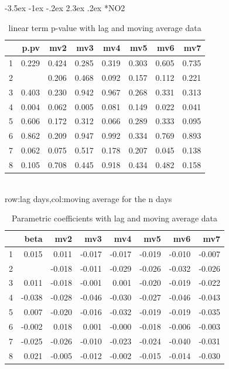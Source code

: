 \documentclass[a4paper, 12pt]{article}
\makeatletter
\def\large{\fontsize{14}{20}\selectfont}
\renewcommand\subsection{\@startsection {subsection}{1}{\z@}%
                                   {-3.5ex \@plus -1ex \@minus -.2ex}%
                                   {2.3ex \@plus.2ex}%
                                   {\centering\normalfont\large\bfseries}}
\makeatother
\begin{document}
\subsection*{NO2}
\begin{table}[h]
\centering
\caption{linear term p-value with lag and moving average data}
\begin{tabular}{rrrrrrrr}
  \hline
 & p.pv & mv2 & mv3 & mv4 & mv5 & mv6 & mv7 \\
  \hline
1 & 0.229 & 0.424 & 0.285 & 0.319 & 0.303 & 0.605 & 0.735 \\
  2 & \color{red}{0.000} & 0.206 & 0.468 & 0.092 & 0.157 & 0.112 & 0.221 \\
  3 & 0.403 & 0.230 & 0.942 & 0.967 & 0.268 & 0.331 & 0.313 \\
  4 & 0.004 & 0.062 & 0.005 & 0.081 & 0.149 & 0.022 & 0.041 \\
  5 & 0.606 & 0.172 & 0.312 & 0.066 & 0.289 & 0.333 & 0.095 \\
  6 & 0.862 & 0.209 & 0.947 & 0.992 & 0.334 & 0.769 & 0.893 \\
  7 & 0.062 & 0.075 & 0.517 & 0.178 & 0.207 & 0.045 & 0.138 \\
  8 & 0.105 & 0.708 & 0.445 & 0.918 & 0.434 & 0.482 & 0.158 \\
   \hline
\end{tabular}
\\row:lag days,col:moving average for the n days
\end{table}

\begin{table}[h]
\centering
\caption{Parametric coefficients with lag and moving average data}
\begin{tabular}{rrrrrrrr}
  \hline
 & beta & mv2 & mv3 & mv4 & mv5 & mv6 & mv7 \\
  \hline
1 & 0.015 & 0.011 & -0.017 & -0.017 & -0.019 & -0.010 & -0.007 \\
  2 & \color{red}{-0.050} & -0.018 & -0.011 & -0.029 & -0.026 & -0.032 & -0.026 \\
  3 & 0.011 & -0.018 & -0.001 & 0.001 & -0.020 & -0.019 & -0.022 \\
  4 & -0.038 & -0.028 & -0.046 & -0.030 & -0.027 & -0.046 & -0.043 \\
  5 & 0.007 & -0.020 & -0.016 & -0.032 & -0.019 & -0.019 & -0.035 \\
  6 & -0.002 & 0.018 & 0.001 & -0.000 & -0.018 & -0.006 & -0.003 \\
  7 & -0.025 & -0.026 & -0.010 & -0.023 & -0.024 & -0.040 & -0.031 \\
  8 & 0.021 & -0.005 & -0.012 & -0.002 & -0.015 & -0.014 & -0.030 \\
   \hline
\end{tabular}
\end{table}
\end{document}
